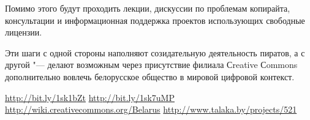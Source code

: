 \documentclass[10pt, a5paper]{article}
\begin{document}
Помимо этого будут проходить лекции, дискуссии по проблемам копирайта, консультации и информационная поддержка проектов использующих свободные лицензии.

Эти шаги с одной стороны наполняют созидательную деятельность пиратов, а с другой "--- делают возможным через присутствие филиала Сreative Сommons дополнительно вовлечь белорусское общество в мировой цифровой контекст.

\begin{thebibliography}{9}
 \url{http://bit.ly/1sk1bZt}
 \url{http://bit.ly/1sk7uMP}
 \url{http://wiki.creativecommons.org/Belarus}
 \url{http://www.talaka.by/projects/521}
\end{thebibliography}
\end{document}

